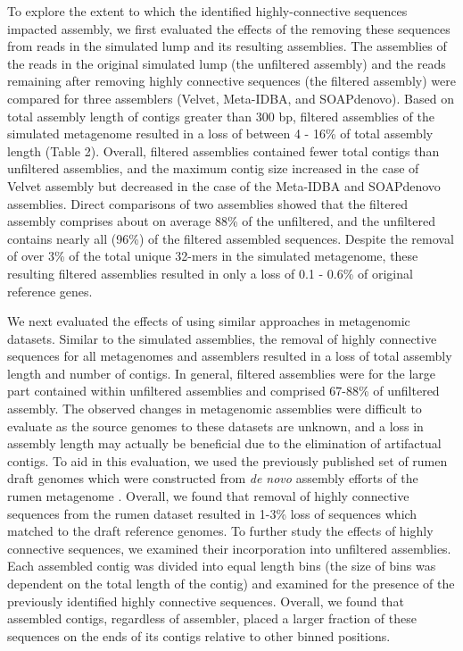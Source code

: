 \documentclass[11pt]{article} %
\begin{document}
To explore the extent to which the identified highly-connective sequences impacted assembly, we first evaluated the effects of the removing these sequences from reads in the simulated lump and its resulting assemblies.  The assemblies of the reads in the original simulated lump (the unfiltered assembly) and the reads remaining after removing highly connective sequences (the filtered assembly) were compared for three assemblers (Velvet, Meta-IDBA, and SOAPdenovo).  Based on total assembly length of contigs greater than 300 bp, filtered assemblies of the simulated metagenome resulted in a loss of between 4 - 16\% of total assembly length (Table 2).  Overall, filtered assemblies contained fewer total contigs than unfiltered assemblies, and the maximum contig size increased in the case of Velvet assembly but decreased in the case of the Meta-IDBA and SOAPdenovo assemblies.  Direct comparisons of two assemblies showed that the filtered assembly comprises about on average 88\% of the unfiltered, and the unfiltered contains nearly all (96\%) of the filtered assembled sequences.  Despite the removal of over 3\% of the total unique 32-mers in the simulated metagenome, these resulting filtered assemblies resulted in only a loss of 0.1 - 0.6\% of original reference genes. 

We next evaluated the effects of using similar approaches in metagenomic datasets.  Similar to the simulated assemblies, the removal of highly connective sequences for all metagenomes and assemblers resulted in a loss of total assembly length and number of contigs.  In general, filtered assemblies were for the large part contained within unfiltered assemblies and comprised 67-88\% of unfiltered assembly.   The observed changes in metagenomic assemblies were difficult to evaluate as the source genomes to these datasets are unknown, and a loss in assembly length may actually be beneficial due to the elimination of artifactual contigs.  To aid in this evaluation, we used the previously published set of rumen draft genomes which were constructed from \emph{de novo} assembly efforts of the rumen metagenome \cite{Hess:2011p686}.  Overall, we found that removal of highly connective sequences from the rumen dataset resulted in 1-3\% loss of sequences which matched to the draft reference genomes.  To further study the effects of highly connective sequences, we examined their incorporation into unfiltered assemblies.  Each assembled contig was divided into equal length bins (the size of bins was dependent on the total length of the contig) and examined for the presence of the previously identified highly connective sequences.  Overall, we found that assembled contigs, regardless of assembler, placed a larger fraction of these sequences on the ends of its contigs relative to other binned positions.
\end{document}
